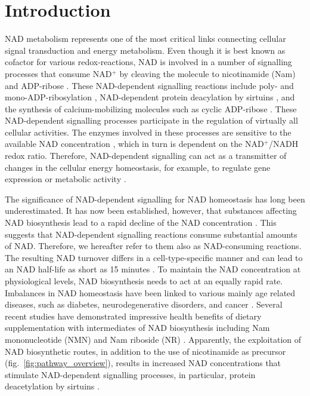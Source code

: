 
\section{Introduction}

NAD metabolism represents one of the most critical links connecting cellular signal transduction and energy metabolism. Even though it is best known as cofactor for various redox-reactions, NAD is involved in a number of signalling processes that consume NAD$^{+}$ by cleaving the molecule to nicotinamide (Nam) and ADP-ribose \cite{Verdin2015}. These NAD-dependent signalling reactions include poly- and mono-ADP-ribosylation \cite{Butepage2015,DeVos2012}, NAD-dependent protein deacylation by sirtuins \cite{Osborne2016}, and the synthesis of calcium-mobilizing molecules such as cyclic ADP-ribose \cite{Lee2012}. These NAD-dependent signalling processes participate in the regulation of virtually all cellular activities. The enzymes involved in these processes are sensitive to the available NAD concentration \cite{Ruggieri2015}, which in turn is dependent on the NAD$^{+}$/NADH redox ratio. Therefore, NAD-dependent signalling can act as a transmitter of changes in the cellular energy homeostasis, for example, to regulate gene expression or metabolic activity \cite{Koch-Nolte2009}.

The significance of NAD-dependent signalling for NAD homeostasis has long been underestimated. It has now been established, however, that substances affecting NAD biosynthesis lead to a rapid decline of the NAD concentration \cite{Buonvicino2018}. This suggests that NAD-dependent signalling reactions consume substantial amounts of NAD. Therefore, we hereafter refer to them also as NAD-consuming reactions. The resulting NAD turnover differs in a cell-type-specific manner and can lead to an NAD half-life as short as 15 minutes \cite{Liu2018}. To maintain the NAD concentration at physiological levels, NAD biosynthesis needs to act at an equally rapid rate. Imbalances in NAD homeostasis have been linked to various mainly age related diseases, such as diabetes, neurodegenerative disorders, and cancer \cite{Chiarugi2012,Verdin2015}. Several recent studies have demonstrated impressive health benefits of dietary supplementation with intermediates of NAD biosynthesis including Nam mononucleotide (NMN) and Nam riboside (NR) \cite{Yoshino2018}. Apparently, the exploitation of NAD biosynthetic routes, in addition to the use of nicotinamide as precursor (fig.~\ref{fig:pathway_overview}), results in increased NAD concentrations that stimulate NAD-dependent signalling processes, in particular, protein deacetylation by sirtuins \cite{North2004}.


